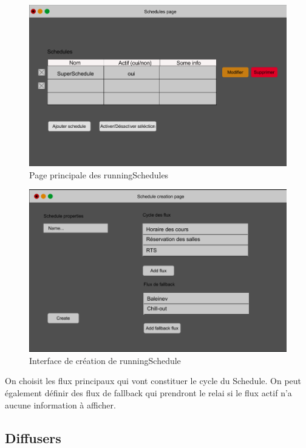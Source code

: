 \documentclass[french]{article}
\begin{document}
	\begin{figure}[h]
		\centering
		\includegraphics[scale=0.4]{mockup/m_schedules_page}
		\caption{Page principale des runningSchedules}
		\label{fig:schedulePage}
	\end{figure}
	
	\begin{figure}[h]
		\centering
		\includegraphics[scale=0.4]{mockup/m_schedule_creation}
		\caption{Interface de création de runningSchedule}
		\label{fig:scheduleCreation}
	\end{figure}
	
	On choisit les flux principaux qui vont constituer le cycle du Schedule. On peut également définir des flux de fallback qui prendront le relai si le flux actif n'a aucune information à afficher.

\newpage
\subsection{Diffusers}
\end{document}

